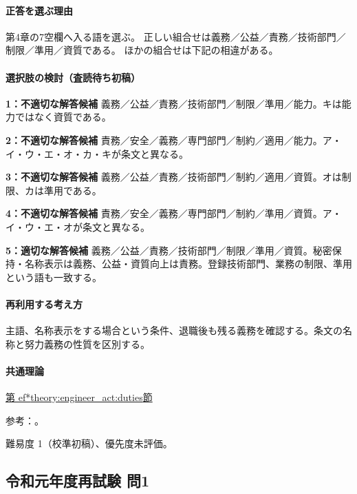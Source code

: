 \paragraph{正答を選ぶ理由} 第4章の7空欄へ入る語を選ぶ。 正しい組合せは義務／公益／責務／技術部門／制限／準用／資質である。 ほかの組合せは下記の相違がある。

\paragraph{選択肢の検討（査読待ち初稿）}

\noindent\textbf{1：不適切な解答候補} 義務／公益／責務／技術部門／制限／準用／能力。キは能力ではなく資質である。\par

\noindent\textbf{2：不適切な解答候補} 責務／安全／義務／専門部門／制約／適用／能力。ア・イ・ウ・エ・オ・カ・キが条文と異なる。\par

\noindent\textbf{3：不適切な解答候補} 義務／公益／責務／技術部門／制約／適用／資質。オは制限、カは準用である。\par

\noindent\textbf{4：不適切な解答候補} 責務／安全／義務／専門部門／制約／準用／資質。ア・イ・ウ・エ・オが条文と異なる。\par

\noindent\textbf{5：適切な解答候補} 義務／公益／責務／技術部門／制限／準用／資質。秘密保持・名称表示は義務、公益・資質向上は責務。登録技術部門、業務の制限、準用という語も一致する。\par

\paragraph{再利用する考え方} 主語、名称表示をする場合という条件、退職後も残る義務を確認する。条文の名称と努力義務の性質を区別する。

\paragraph{共通理論} \hyperref[theory:engineer_act:duties]{第
ef*{theory:engineer_act:duties}節}

\par 参考：\cite{engineer_act_current}。

\par 難易度 1（校準初稿）、優先度未評価。

\subsection{令和元年度再試験 問1}
\label{q:r01-ret-apt-01}

